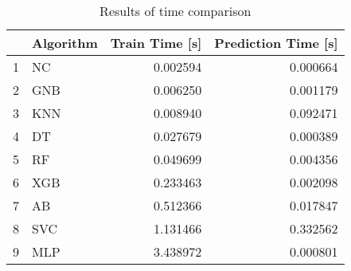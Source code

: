 \begin{table}
\footnotesize
\caption{Results of time comparison}
\label{tab:time comparison}
\begin{tabular}{llrr}
\hline
 & Algorithm & Train Time [s] & Prediction Time [s] \\
\hline
1 & NC & 0.002594 & 0.000664 \\
2 & GNB & 0.006250 & 0.001179 \\
3 & KNN & 0.008940 & 0.092471 \\
4 & DT & 0.027679 & 0.000389 \\
5 & RF & 0.049699 & 0.004356 \\
6 & XGB & 0.233463 & 0.002098 \\
7 & AB & 0.512366 & 0.017847 \\
8 & SVC & 1.131466 & 0.332562 \\
9 & MLP & 3.438972 & 0.000801 \\
\hline
\end{tabular}
\end{table}
